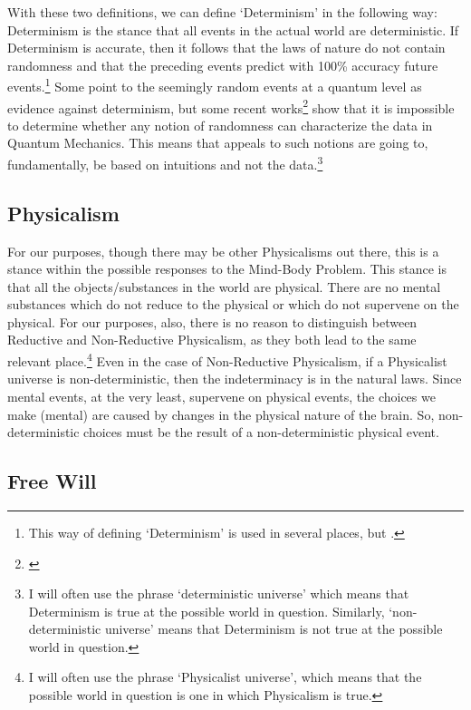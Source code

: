 With these two definitions, we can define ‘Determinism' in the following way: Determinism is the stance that all events in the actual world are deterministic. If Determinism is accurate, then it follows that the laws of nature do not contain randomness and that the preceding events predict with 100\% accuracy future events.\footnote{This way of defining ‘Determinism’ is used in several places, but \cite[most notably in][ ]{Popper1}.} Some point to the seemingly random events at a quantum level as evidence against determinism, but some recent works\footnote{\parencite{Barrett1}} show that it is impossible to determine whether any notion of randomness can characterize the data in Quantum Mechanics. This means that appeals to such notions are going to, fundamentally, be based on intuitions and not the data.\footnote{I will often use the phrase ‘deterministic universe’ which means that Determinism is true at the possible world in question. Similarly, ‘non-deterministic universe’ means that Determinism is not true at the possible world in question.}
\subsection{Physicalism}

For our purposes, though there may be other Physicalisms out there, this is a stance within the possible responses to the Mind-Body Problem. This stance is that all the objects/substances in the world are physical. There are no mental substances which do not reduce to the physical or which do not supervene on the physical. For our purposes, also, there is no reason to distinguish between Reductive and Non-Reductive Physicalism, as they both lead to the same relevant place.\footnote{I will often use the phrase ‘Physicalist universe’, which means that the possible world in question is one in which Physicalism is true.} Even in the case of Non-Reductive Physicalism, if a Physicalist universe is non-deterministic, then the indeterminacy is in the natural laws. Since mental events, at the very least, supervene on physical events, the choices we make (mental) are caused by changes in the physical nature of the brain. So, non-deterministic choices must be the result of a non-deterministic physical event.
\subsection{Free Will}

